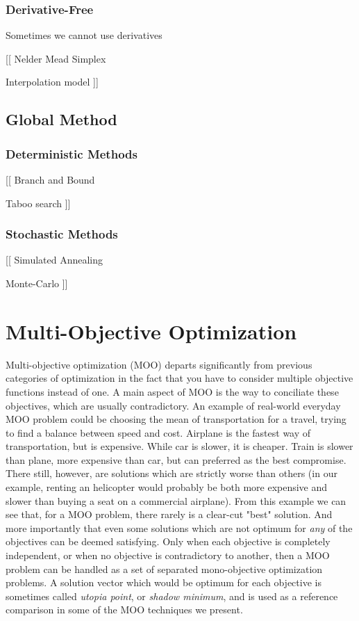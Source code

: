 \subsection{Derivative-Free}

Sometimes we cannot use derivatives 

[[
Nelder Mead Simplex

Interpolation model
]]

\section{Global Method}

\subsection{Deterministic Methods}

[[
Branch and Bound

Taboo search
]]

\subsection{Stochastic Methods}

[[
Simulated Annealing

Monte-Carlo
]]

\chapter{Multi-Objective Optimization}

Multi-objective optimization (MOO) departs significantly from previous categories of optimization in the fact that you have to consider multiple objective functions instead of one. A main aspect of MOO is the way to conciliate these objectives, which are usually contradictory.
An example of real-world everyday MOO problem could be choosing the mean of transportation for a travel, trying to find a balance between speed and cost. Airplane is the fastest way of transportation, but is expensive. While car is slower, it is cheaper. Train is slower than plane, more expensive than car, but can preferred as the best compromise. There still, however, are solutions which are strictly worse than others (in our example, renting an helicopter would probably be both more expensive and slower than buying a seat on a commercial airplane).
From this example we can see that, for a MOO problem, there rarely is a clear-cut "best" solution. And more importantly that even some solutions which are not optimum for \emph{any} of the objectives can be deemed satisfying. Only when each objective is completely independent, or when no objective is contradictory to another, then a MOO problem can be handled as a set of separated mono-objective optimization problems.
A solution vector which would be optimum for each objective is sometimes called \emph{utopia point}, or \emph{shadow minimum}, and is used as a reference comparison in some of the MOO techniques we present.


